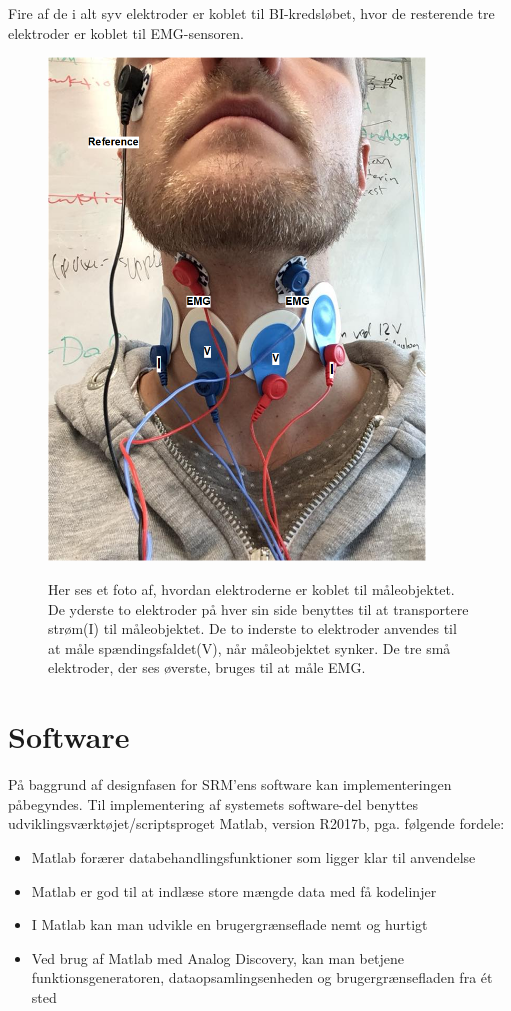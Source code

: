 Fire af de i alt syv elektroder er koblet til BI-kredsløbet, hvor de resterende tre elektroder er koblet til EMG-sensoren.   
\begin{figure}[H] 
\centering
{\includegraphics[width=10cm]
{Figure/maleobjektmedelektroder}}
\caption{Her ses et foto af, hvordan elektroderne er koblet til måleobjektet. De yderste to elektroder på hver sin side benyttes til at transportere strøm(I) til måleobjektet. De to inderste to elektroder anvendes til at måle spændingsfaldet(V), når måleobjektet synker. De tre små elektroder, der ses øverste, bruges til at måle EMG.}
\label{fig:maaleobjekt}
\end{figure}

\pagebreak
\section{Software}

På baggrund af designfasen for SRM'ens software kan implementeringen påbegyndes. Til implementering af systemets software-del benyttes  udviklingsværktøjet/scriptsproget Matlab, version R2017b, pga. følgende fordele:


\begin{itemize}
\item Matlab forærer databehandlingsfunktioner som ligger klar til anvendelse
\item Matlab er god til at indlæse store mængde data med få kodelinjer
\item I Matlab kan man udvikle en brugergrænseflade nemt og hurtigt 
\item Ved brug af Matlab med Analog Discovery, kan man betjene  funktionsgeneratoren, dataopsamlingsenheden og brugergrænsefladen  fra ét sted
\end{itemize}
   
